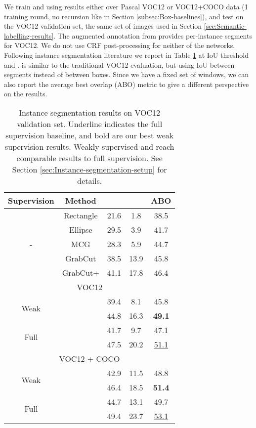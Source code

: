 \documentclass[10pt,english,british,twocolumn]{article}
\providecommand{\tabularnewline}{\\}
\begin{document}
We train  and  using
 results either over Pascal VOC12 or VOC12+COCO
data (1 training round, no recursion like in Section \ref{subsec:Box-baselines}),
and test on the VOC12 validation set, the same set of images used
in Section \ref{sec:Semantic-labelling-results}. The augmented annotation
from \cite{Hariharan2011Iccv} provides per-instance segments for
VOC12. We do not use CRF post-processing for neither of the networks.\\
Following instance segmentation literature \cite{Hariharan2014Eccv,Hariharan2015Cvpr}
we report in Table \ref{tab:Instance-segmentation-results} 
at IoU threshold  and .  is similar
to the traditional VOC12 evaluation, but using IoU between segments
instead of between boxes. Since we have a fixed set of windows, we
can also report the average best overlap (ABO) \cite{PontTuset2015Iccv}
metric to give a different perspective on the results.
\begin{table}
\begin{centering}
\begin{tabular}{cc|cc|c}
Supervision & Method & \hspace*{-1em} &  & ABO\tabularnewline
\hline 
\hline 
\multirow{5}{*}{- } & Rectangle\textsuperscript{} & 21.6 & 1.8 & 38.5\tabularnewline
 & Ellipse & 29.5 & 3.9 & 41.7\tabularnewline
 & MCG & 28.3 & 5.9 & 44.7\tabularnewline
 & GrabCut & 38.5 & 13.9 & 45.8\tabularnewline
 & GrabCut+ & 41.1 & 17.8 & 46.4\tabularnewline
\hline 
\hline 
\multicolumn{5}{c}{\cellcolor{verylightgray}VOC12}\tabularnewline
\multirow{2}{*}{Weak} &  & 39.4 & 8.1 & 45.8\tabularnewline
 &  & 44.8 & 16.3 & \textbf{49.1}\tabularnewline
\hline 
\multirow{2}{*}{Full} &  & 41.7 & 9.7 & 47.1\tabularnewline
 &  & 47.5 & 20.2 & \uline{51.1}\tabularnewline
\hline 
\hline 
\multicolumn{5}{c}{\cellcolor{verylightgray}VOC12 + COCO}\tabularnewline
\multirow{2}{*}{Weak} &  & 42.9 & 11.5 & 48.8\tabularnewline
 &  & 46.4 & 18.5 & \textbf{51.4}\tabularnewline
\hline 
\multirow{2}{*}{Full} &  & 44.7 & 13.1 & 49.7\tabularnewline
 &  & 49.4 & 23.7 & \uline{53.1}\tabularnewline
\end{tabular}\vspace{-0.5em}
\caption{\label{tab:Instance-segmentation-results}Instance segmentation results
on VOC12 validation set. Underline indicates the full supervision
baseline, and bold are our best weak supervision results. Weakly supervised
 and  reach comparable
results to full supervision. See Section \ref{sec:Instance-segmentation-setup}
for details. }
\par\end{centering}
\vspace{-1em}
\end{table}
\end{document}
